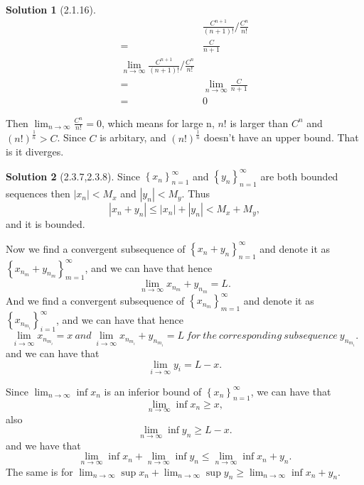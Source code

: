 \documentclass{article}
\theoremstyle{definition}
\newtheorem{sol}{Solution}[exe]
\begin{document}
\begin{sol}[2.1.16]

    \begin{align*}
        & \frac{C^{n+1}}{(n+1)!}/\frac{C^{n}}{n!}\\
        =& \frac{C}{n+1}\\
        \lim_{n\to\infty}\frac{C^{n+1}}{(n+1)!}/\frac{C^{n}}{n!}\\
        =& \lim_{n\to\infty}\frac{C}{n+1}\\
        =& 0
    \end{align*}

    Then $\lim_{n\to\infty}\frac{C^{n}}{n!}=0$, which means for large n, $n!$ is larger than $C^{n}$ and $(n!)^{\frac{1}{n}}>C$. Since $C$ is arbitary, and $(n!)^{\frac{1}{n}}$ 
    doesn't have an upper bound. That is it diverges.
\end{sol}


\begin{sol}[2.3.7,2.3.8]

Since $\left\{x_{n}\right\}_{n=1}^{\infty}$ and $\left\{y_{n}\right\}_{n=1}^{\infty}$ are both bounded sequences then $|x_{n}|<M_{x}$ and $|y_{n}|<M_{y}$. Thus 
$$|x_{n}+y_{n}|\leq |x_{n}|+|y_{n}| < M_{x}+M_{y},$$
and it is bounded.

Now we find a convergent subsequence of $\left\{x_{n}+y_{n}\right\}_{n=1}^{\infty}$ and denote it as $\left\{x_{n_{m}}+y_{n_{m}}\right\}_{m=1}^{\infty}$, and we can have that
hence $$\lim_{n\to\infty}x_{n_{m}}+y_{n_{m}}=L.$$
And we find a convergent subsequence of $\left\{x_{n_{m}}\right\}_{m=1}^{\infty}$ and denote it as $\left\{x_{n_{m_{i}}}\right\}_{i=1}^{\infty}$, and we can have that
hence $$\lim_{i\to\infty}x_{n_{m_{i}}}=x\ and\ \lim_{i\to\infty}x_{n_{m_{i}}}+y_{n_{m_{i}}}=L\ for\ the\ corresponding\ subsequence\ y_{n_{m_{i}}}.$$
and we can have that $$\lim_{i\to\infty}y_{i} = L-x.$$

Since $\lim_{n\to\infty}\inf x_{n}$ is an inferior bound of $\left\{x_{n}\right\}_{n=1}^{\infty}$, we can have that 
$$\lim_{n\to\infty}\inf x_{n} \geq x,$$
also 
$$\lim_{n\to\infty}\inf y_{n} \geq L-x.$$
and we have that $$\lim_{n\to\infty}\inf x_{n}+\lim_{n\to\infty}\inf y_{n} \leq \lim_{n\to\infty}\inf x_{n}+y_{n}.$$
The same is for $\lim_{n\to\infty}\sup x_{n}+\lim_{n\to\infty}\sup y_{n}\geq\lim_{n\to\infty}\inf x_{n}+y_{n}$.

\end{sol}
\end{document}
